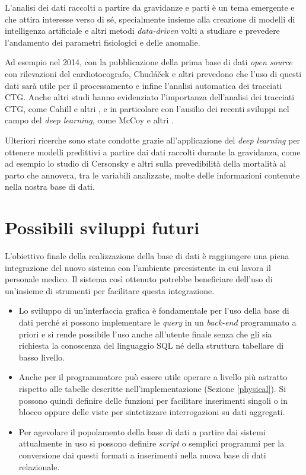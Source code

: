 L'analisi dei dati raccolti a partire da gravidanze e parti è un tema emergente e che attira interesse verso di sé, specialmente insieme alla creazione di modelli di intelligenza artificiale e altri metodi \emph{data-driven} volti a studiare e prevedere l'andamento dei parametri fisiologici e delle anomalie.

Ad esempio nel 2014, con la pubblicazione della prima base di dati \emph{open source} con rilevazioni del cardiotocografo, Chudáček e altri \cite{Chu14} prevedono che l'uso di questi dati sarà utile per il processamento e infine l'analisi automatica dei tracciati CTG.
Anche altri studi hanno evidenziato l'importanza dell'analisi dei tracciati CTG, come Cahill e altri \cite{Cah18}, e in particolare con l'ausilio dei recenti sviluppi nel campo del \emph{deep learning}, come McCoy e altri \cite{McC25}.

Ulteriori ricerche sono state condotte grazie all'applicazione del \emph{deep learning} per ottenere modelli predittivi a partire dai dati raccolti durante la gravidanza, come ad esempio lo studio di Cersonsky e altri \cite{Cer23} sulla prevedibilità della mortalità al parto che annovera, tra le variabili analizzate, molte delle informazioni contenute nella nostra base di dati.

\section{Possibili sviluppi futuri}

L'obiettivo finale della realizzazione della base di dati è raggiungere una piena integrazione del nuovo sistema con l'ambiente preesistente in cui lavora il personale medico.
Il sistema così ottenuto potrebbe beneficiare dell'uso di un'insieme di strumenti per facilitare questa integrazione.
\begin{itemize}
\item Lo sviluppo di un'interfaccia grafica è fondamentale per l'uso della base di dati perché si possono implementare le \emph{query} in un \emph{back-end} programmato a priori e si rende possibile l'uso anche all'utente finale senza che gli sia richiesta la conoscenza del linguaggio SQL né della struttura tabellare di basso livello.
\item Anche per il programmatore può essere utile operare a livello più astratto rispetto alle tabelle descritte nell'implementazione (Sezione \ref{physical}). Si possono quindi definire delle funzioni per facilitare inserimenti singoli o in blocco oppure delle viste per sintetizzare interrogazioni su dati aggregati. 
\item Per agevolare il popolamento della base di dati a partire dai sistemi attualmente in uso si possono definire \emph{script} o semplici programmi per la conversione dai questi formati a inserimenti nella nuova base di dati relazionale.
\end{itemize}